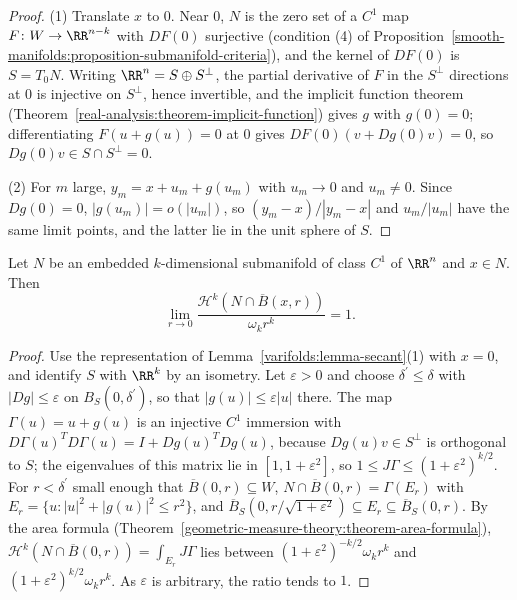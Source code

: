 \begin{proof}
(1) Translate $x$ to $0$. Near $0$, $N$ is the zero set of a $C^1$ map $F \colon W \to \RR^{n-k}$ with $DF(0)$ surjective (condition (4) of
Proposition~\ref{smooth-manifolds:proposition-submanifold-criteria}), and the kernel of $DF(0)$ is $S = T_0N$.
Writing $\RR^n = S \oplus S^\perp$, the partial derivative of $F$ in the $S^\perp$ directions at $0$ is injective on $S^\perp$, hence invertible, and the implicit function theorem
(Theorem~\ref{real-analysis:theorem-implicit-function}) gives $g$ with $g(0) = 0$; differentiating $F(u + g(u)) = 0$ at $0$ gives $DF(0)(v + Dg(0)v) = 0$, so $Dg(0)v \in S \cap S^\perp = 0$.

(2) For $m$ large, $y_m = x + u_m + g(u_m)$ with $u_m \to 0$ and $u_m \neq 0$. Since $Dg(0) = 0$, $|g(u_m)| = o(|u_m|)$, so $(y_m - x)/|y_m - x|$ and $u_m/|u_m|$ have the same limit points, and the latter lie in
the unit sphere of $S$.
\end{proof}

\begin{lemma}\label{varifolds:lemma-submanifold-density}
Let $N$ be an embedded $k$-dimensional submanifold of class $C^1$ of $\RR^n$ and $x \in N$. Then
\[
\lim_{r \to 0}\frac{\mathcal{H}^k(N \cap \overline{B}(x, r))}{\omega_kr^k} = 1 .
\]
\end{lemma}

\begin{proof}
Use the representation of Lemma~\ref{varifolds:lemma-secant}(1) with $x = 0$, and identify $S$ with $\RR^k$ by an isometry. Let $\varepsilon > 0$ and choose $\delta^{\prime} \leq \delta$ with $|Dg| \leq \varepsilon$ on
$B_S(0, \delta^{\prime})$, so that $|g(u)| \leq \varepsilon|u|$ there. The map $\Gamma(u) = u + g(u)$ is an injective $C^1$ immersion with $D\Gamma(u)^TD\Gamma(u) = I + Dg(u)^TDg(u)$, because $Dg(u)v \in S^\perp$ is
orthogonal to $S$; the eigenvalues of this matrix lie in $[1, 1 + \varepsilon^2]$, so $1 \leq J\Gamma \leq (1 + \varepsilon^2)^{k/2}$. For $r < \delta^{\prime}$ small enough that $\overline{B}(0, r) \subseteq W$,
$N \cap \overline{B}(0, r) = \Gamma(E_r)$ with $E_r = \{u : |u|^2 + |g(u)|^2 \leq r^2\}$, and $\overline{B}_S(0, r/\sqrt{1 + \varepsilon^2}) \subseteq E_r \subseteq \overline{B}_S(0, r)$. By the area formula
(Theorem~\ref{geometric-measure-theory:theorem-area-formula}), $\mathcal{H}^k(N \cap \overline{B}(0, r)) = \int_{E_r}J\Gamma$ lies between $(1 + \varepsilon^2)^{-k/2}\omega_kr^k$ and
$(1 + \varepsilon^2)^{k/2}\omega_kr^k$. As $\varepsilon$ is arbitrary, the ratio tends to $1$.
\end{proof}

